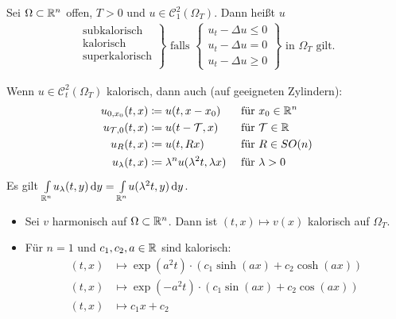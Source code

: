 \documentclass{cheat-sheet}
\newcommand{\Tau}{\mathcal{T}} %
\begin{document}

\begin{defn}
  Sei $\Omega \subset \mathbb{R}^n$ offen, $T > 0$ und $u \in \mathcal{C}^2_1(\Omega_T)$. Dann heißt $u$
  \begin{align*}
    \left. \begin{array}{l}
      \text{subkalorisch}\\
      \text{kalorisch}\\
      \text{superkalorisch}\\
    \end{array} \right\}
    \text{ falls }
    \left\{ \begin{array}{l}
      u_t - \Delta u \leq 0\\
      u_t - \Delta u = 0\\
      u_t - \Delta u \geq 0
    \end{array} \right\}
    \text{ in $\Omega_T$ gilt.}
  \end{align*}
\end{defn}

\begin{bem}
  Wenn $u \in \mathcal{C}^2_t(\Omega_T)$ kalorisch, dann auch (auf geeigneten Zylindern):
  \begin{alignat*}{3}
    u_{0,x_0}(t,x) &\coloneqq u(t, x-x_0) &&\text{ für } x_0 \in \R^n\\
    u_{\Tau, 0}(t,x) &\coloneqq u(t-\Tau, x) &&\text{ für } \Tau \in \R\\
    u_R(t,x) &\coloneqq u(t, Rx) &&\text{ für } R \in SO(n)\\
    u_\lambda(t,x) &\coloneqq \lambda^{n} u(\lambda^2 t, \lambda x) &&\text{ für } \lambda > 0
  \end{alignat*}
  Es gilt ${\textstyle \int\limits_{\mathbb{R}^n}^{}} u_\lambda(t, y) \,\mathrm{d} y = {\textstyle \int\limits_{\mathbb{R}^n}^{}} u(\lambda^2 t, y) \,\mathrm{d} y$.
\end{bem}

\begin{bspe}
  \begin{itemize}
    \item Sei $v$ harmonisch auf $\Omega \subset \mathbb{R}^n$. Dann ist $(t, x) \mapsto v(x)$ kalorisch auf $\Omega_T$.
    \item Für $n=1$ und $c_1, c_2, a \in \mathbb{R}$ sind kalorisch:
    \begin{align*}
      (t, x) &\mapsto \exp(a^2 t) \cdot (c_1 \sinh(a x) + c_2 \cosh(a x))\\
      (t, x) &\mapsto \exp(-a^2 t) \cdot (c_1 \sin(a x) + c_2 \cos(a x))\\
      (t, x) &\mapsto c_1 x + c_2
    \end{align*}
  \end{itemize}
\end{bspe}
\end{document}
